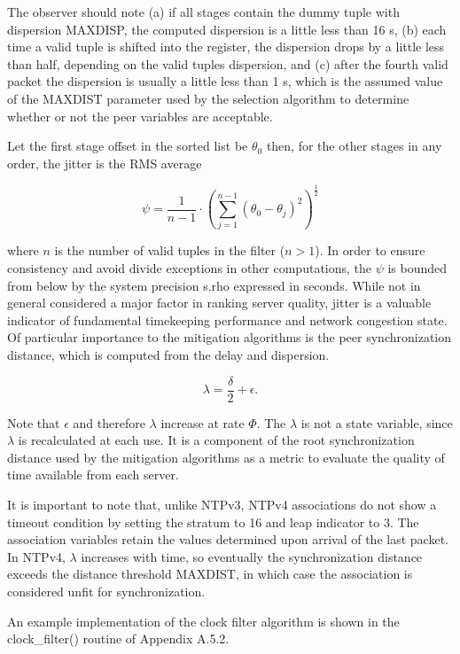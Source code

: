 The observer should note (a) if all stages contain the dummy tuple
with dispersion MAXDISP, the computed dispersion is a little less
than 16 s, (b) each time a valid tuple is shifted into the register,
the dispersion drops by a little less than half, depending on the
valid tuples dispersion, and (c) after the fourth valid packet the
dispersion is usually a little less than 1 s, which is the assumed
value of the MAXDIST parameter used by the selection algorithm to
determine whether or not the peer variables are acceptable.

Let the first stage offset in the sorted list be $ \theta_0 $\; then, for
the other stages in any order, the jitter is the RMS average

$$
\psi = \frac{1}{n - 1} \cdot \left( \sum^{n - 1}_{j = 1} (\theta_0 - \theta_j)^2 \right)^{\frac{1}{2}}
$$

where $ n $ is the number of valid tuples in the filter ($ n > 1 $).  In
order to ensure consistency and avoid divide exceptions in other
computations, the $ \psi $ is bounded from below by the system precision
s.rho expressed in seconds.  While not in general considered a major
factor in ranking server quality, jitter is a valuable indicator of
fundamental timekeeping performance and network congestion state.  Of
particular importance to the mitigation algorithms is the peer
synchronization distance, which is computed from the delay and
dispersion.

$$
\lambda = \frac{\delta}{2} + \epsilon.
$$

Note that $ \epsilon $ and therefore $ \lambda $ increase at rate $ \Phi $.  The
$ \lambda $ is not a state variable, since $ \lambda $ is recalculated at each
use.  It is a component of the root synchronization distance used by
the mitigation algorithms as a metric to evaluate the quality of time
available from each server.

It is important to note that, unlike NTPv3, NTPv4 associations do not
show a timeout condition by setting the stratum to 16 and leap
indicator to 3.  The association variables retain the values
determined upon arrival of the last packet.  In NTPv4, $ \lambda $
increases with time, so eventually the synchronization distance
exceeds the distance threshold MAXDIST, in which case the association
is considered unfit for synchronization.

An example implementation of the clock filter algorithm is shown in
the clock\_filter() routine of Appendix A.5.2.
